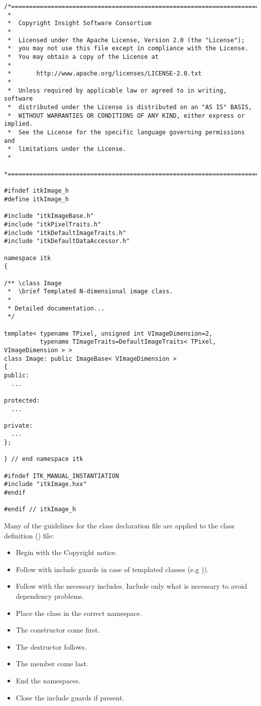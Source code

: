 \small
\begin{verbatim}
/*=========================================================================
 *
 *  Copyright Insight Software Consortium
 *
 *  Licensed under the Apache License, Version 2.0 (the "License");
 *  you may not use this file except in compliance with the License.
 *  You may obtain a copy of the License at
 *
 *       http://www.apache.org/licenses/LICENSE-2.0.txt
 *
 *  Unless required by applicable law or agreed to in writing, software
 *  distributed under the License is distributed on an "AS IS" BASIS,
 *  WITHOUT WARRANTIES OR CONDITIONS OF ANY KIND, either express or implied.
 *  See the License for the specific language governing permissions and
 *  limitations under the License.
 *
 *=========================================================================*/

#ifndef itkImage_h
#define itkImage_h

#include "itkImageBase.h"
#include "itkPixelTraits.h"
#include "itkDefaultImageTraits.h"
#include "itkDefaultDataAccessor.h"

namespace itk
{

/** \class Image
 *  \brief Templated N-dimensional image class.
 *
 * Detailed documentation...
 */

template< typename TPixel, unsigned int VImageDimension=2,
          typename TImageTraits=DefaultImageTraits< TPixel, VImageDimension > >
class Image: public ImageBase< VImageDimension >
{
public:
  ...

protected:
  ...

private:
  ...
};

} // end namespace itk

#ifndef ITK_MANUAL_INSTANTIATION
#include "itkImage.hxx"
#endif

#endif // itkImage_h
\end{verbatim}
\normalsize

Many of the guidelines for the class declaration file are applied to the class
definition () file:
\begin{itemize}
\item Begin with the Copyright notice.
\item Follow with include guards in case of templated classes (e.g
)).
\item Follow with the necessary includes. Include only what is necessary to
avoid dependency problems.
\item Place the class in the correct namespace.
\item The constructor come first.
\item The destructor follows.
\item The  member come last.
\item End the namespaces.
\item Close the include guards if present.
\end{itemize}

